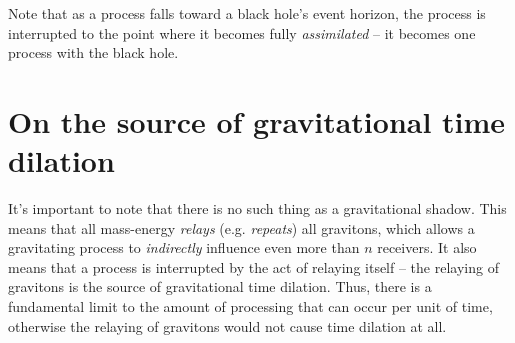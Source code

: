 \documentclass[12pt]{article}
\begin{document}
{%


Note that as a process falls toward a black hole's event horizon, the process is interrupted to the point where it becomes fully {\textit{assimilated}} -- it becomes one process with the black hole.





\section{On the source of gravitational time dilation}
It's important to note that there is no such thing as a gravitational shadow.
This means that all mass-energy {\textit{relays}} (e.g. {\textit{repeats}}) all gravitons, which allows a gravitating process to {\textit{indirectly}} influence even more than $n$ receivers.
It also means that a process is interrupted by the act of relaying itself -- the relaying of gravitons is the source of gravitational time dilation.
Thus, there is a fundamental limit to the amount of processing that can occur per unit of time, otherwise the relaying of gravitons would not cause time dilation at all.



}
\end{document}
